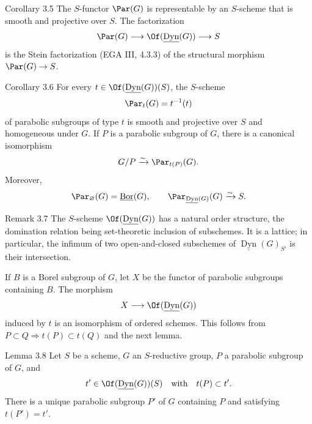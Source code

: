 \begin{sgastatement}{Corollary 3.5}
The \(S\)-functor \(\Par(G)\) is representable by an \(S\)-scheme that is
smooth and projective over \(S\).  The factorization
\[
 \Par(G)\longrightarrow
 \Of(\underline{\operatorname{Dyn}}(G))
 \longrightarrow S
\]
is the Stein factorization \textup{(EGA III, 4.3.3)} of the structural
morphism \(\Par(G)\to S\).
\end{sgastatement}

\begin{sgastatement}{Corollary 3.6}
For every
\(t\in\Of(\underline{\operatorname{Dyn}}(G))(S)\), the \(S\)-scheme
\[
 \Par_t(G)=t^{-1}(t)
\]
of parabolic subgroups of type \(t\) is smooth and projective over \(S\)
and homogeneous under \(G\).  If \(P\) is a parabolic subgroup of \(G\),
there is a canonical isomorphism
\[
 G/P\xrightarrow{\sim}\Par_{t(P)}(G).
\]
Moreover,
\[
 \Par_{\varnothing}(G)=\underline{\operatorname{Bor}}(G),
 \qquad
 \Par_{\underline{\operatorname{Dyn}}(G)}(G)\xrightarrow{\sim}S.
\]
\end{sgastatement}

\begin{sgastatement}{Remark 3.7}
The \(S\)-scheme \(\Of(\underline{\operatorname{Dyn}}(G))\) has a natural
order structure, the domination relation being set-theoretic inclusion of
subschemes.  It is a lattice; in particular, the infimum of two
open-and-closed subschemes of
\(\underline{\operatorname{Dyn}}(G)_{S'}\) is their intersection.

If \(B\) is a Borel subgroup of \(G\), let \(X\) be the functor of
parabolic subgroups containing \(B\).  The morphism
\[
 X\longrightarrow\Of(\underline{\operatorname{Dyn}}(G))
\]
induced by \(t\) is an isomorphism of ordered schemes.  This follows from
\(P\subset Q\Rightarrow t(P)\subset t(Q)\) and the next lemma.
\end{sgastatement}

\begin{sgastatement}{Lemma 3.8}
Let \(S\) be a scheme, \(G\) an \(S\)-reductive group, \(P\) a parabolic
subgroup of \(G\), and
\[
 t'\in\Of(\underline{\operatorname{Dyn}}(G))(S)
\quad\text{with}\quad
 t(P)\subset t'.
\]
There is a unique parabolic subgroup \(P'\) of \(G\) containing \(P\)
and satisfying \(t(P')=t'\).
\end{sgastatement}

